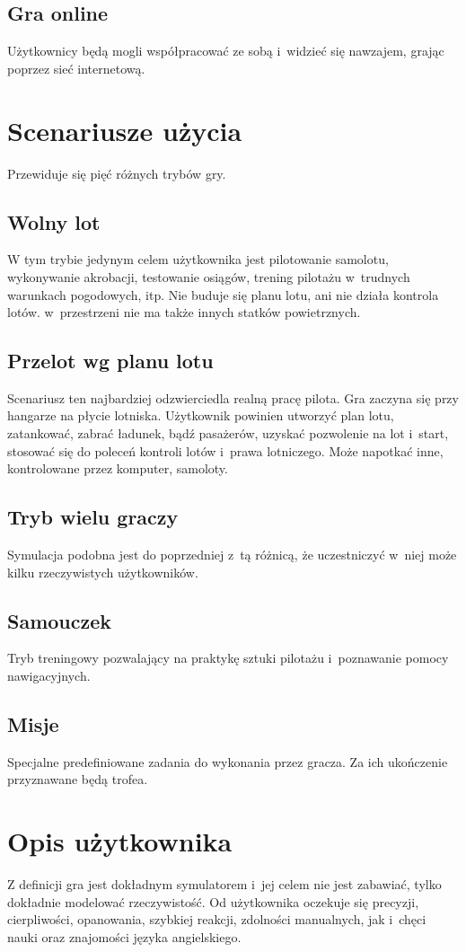 \documentclass{mwrep}
\begin{document}
\subsection{Gra online}
Użytkownicy będą mogli współpracować ze sobą i~widzieć się nawzajem, grając poprzez sieć internetową.

\section{Scenariusze użycia}
Przewiduje się pięć różnych trybów gry.
\subsection{Wolny lot}
W tym trybie jedynym celem użytkownika jest pilotowanie samolotu, wykonywanie akrobacji, testowanie osiągów, trening pilotażu w~trudnych warunkach pogodowych, itp. Nie buduje się planu lotu, ani nie działa kontrola lotów. w~przestrzeni nie ma także innych statków powietrznych.
\subsection{Przelot wg planu lotu}
Scenariusz ten najbardziej odzwierciedla realną pracę pilota. Gra zaczyna się przy hangarze na płycie lotniska. Użytkownik powinien utworzyć plan lotu, zatankować, zabrać ładunek, bądź pasażerów, uzyskać pozwolenie na lot i~start, stosować się do poleceń kontroli lotów i~prawa lotniczego. Może napotkać inne, kontrolowane przez komputer, samoloty.
\subsection{Tryb wielu graczy}
Symulacja podobna jest do poprzedniej z~tą różnicą, że uczestniczyć w~niej może kilku rzeczywistych użytkowników.
\subsection{Samouczek}
Tryb treningowy pozwalający na praktykę sztuki pilotażu i~poznawanie pomocy nawigacyjnych.
\subsection{Misje}
Specjalne predefiniowane zadania do wykonania przez gracza. Za ich ukończenie przyznawane będą trofea.

\section{Opis użytkownika}
Z definicji gra jest dokładnym symulatorem i~jej celem nie jest zabawiać, tylko dokładnie modelować rzeczywistość. Od użytkownika oczekuje się precyzji, cierpliwości, opanowania, szybkiej reakcji, zdolności manualnych, jak i~chęci nauki oraz znajomości języka angielskiego.
\end{document}
